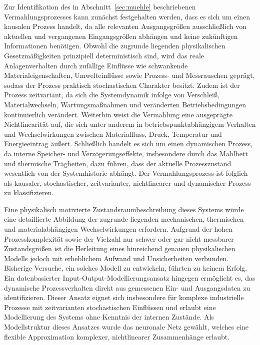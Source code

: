 Zur Identifikation des in Abschnitt~\ref{sec:muehle} beschriebenen Vermahlungsprozesses kann zunächst festgehalten werden, dass es sich um einen kausalen Prozess handelt, da alle relevanten Ausgangsgrößen ausschließlich von aktuellen und vergangenen Eingangsgrößen abhängen und keine zukünftigen Informationen benötigen. Obwohl die zugrunde liegenden physikalischen Gesetzmäßigkeiten prinzipiell deterministisch sind, wird das reale Anlagenverhalten durch zufällige Einflüsse wie schwankende Materialeigenschaften, Umwelteinflüsse sowie Prozess- und Messrauschen geprägt, sodass der Prozess praktisch stochastischen Charakter besitzt. Zudem ist der Prozess zeitvariant, da sich die Systemdynamik infolge von Verschleiß, Materialwechseln, Wartungsmaßnahmen und veränderten Betriebsbedingungen kontinuierlich verändert. Weiterhin weist die Vermahlung eine ausgeprägte Nichtlinearität auf, die sich unter anderem in betriebspunktabhängigem Verhalten und Wechselwirkungen zwischen Materialfluss, Druck, Temperatur und Energieeintrag äußert. Schließlich handelt es sich um einen dynamischen Prozess, da interne Speicher- und Verzögerungseffekte, insbesondere durch das Mahlbett und thermische Trägheiten, dazu führen, dass der aktuelle Prozesszustand wesentlich von der Systemhistorie abhängt. Der Vermahlungsprozess ist folglich als kausaler, stochastischer, zeitvarianter, nichtlinearer und dynamischer Prozess zu klassifizieren. \par
Eine physikalisch motivierte Zustandsraumbeschreibung dieses Systems würde eine detaillierte Abbildung der zugrunde liegenden mechanischen, thermischen und materialabhängigen Wechselwirkungen erfordern. Aufgrund der hohen Prozesskomplexität sowie der Vielzahl nur schwer oder gar nicht messbarer Zustandsgrößen ist die Herleitung eines hinreichend genauen physikalischen Modells jedoch mit erheblichem Aufwand und Unsicherheiten verbunden. Bisherige Versuche, ein solches Modell zu entwickeln, führten zu keinem Erfolg.
Ein datenbasierter Input-Output-Modellierungsansatz hingegen ermöglicht es, das dynamische Prozessverhalten direkt aus gemessenen Ein- und Ausgangsdaten zu identifizieren. Dieser Ansatz eignet sich insbesondere für komplexe industrielle Prozesse mit zeitvarianten stochastischen Einflüssen und erlaubt eine Modellierung des Systems ohne Kenntnis der internen Zustände. Als Modellstruktur dieses Ansatzes wurde das neuronale Netz gewählt, welches eine flexible Approximation komplexer, nichtlinearer Zusammenhänge erlaubt.
%
